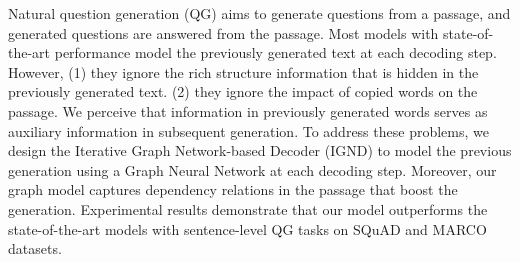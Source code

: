 Natural question generation (QG) aims to generate questions from a passage, and generated questions are answered from the passage. Most models with state-of-the-art performance model the previously generated text at each decoding step. However, (1) they ignore the rich structure information that is hidden in the previously generated text. (2) they ignore the impact of copied words on the passage. We perceive that information in previously generated words serves as auxiliary information in subsequent generation. To address these problems, we design the Iterative Graph Network-based Decoder (IGND) to model the previous generation using a Graph Neural Network at each decoding step. Moreover, our graph model captures dependency relations in the passage that boost the generation. Experimental results demonstrate that our model outperforms the state-of-the-art models with sentence-level QG tasks on SQuAD and MARCO datasets.
